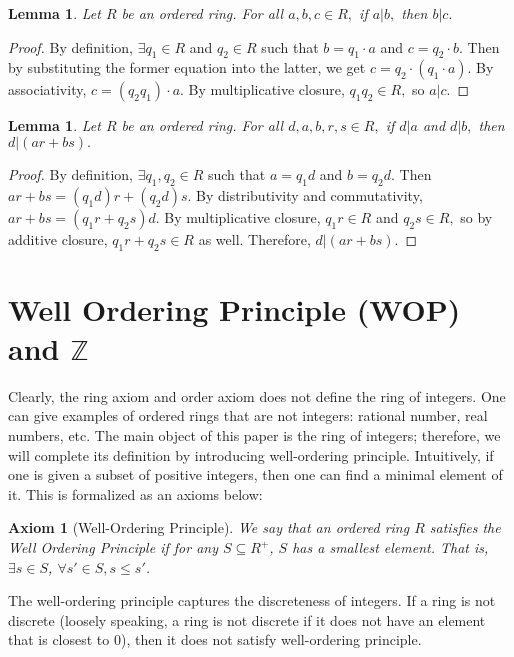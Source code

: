 \documentclass{article}
\newcommand{\Z}{\mathbb{Z}}
\newtheorem{lem}[thm]{Lemma}
\newtheorem{axiom}[thm]{Axiom}
\begin{document}
\begin{lem}
\label{1.9} Let $R$ be an ordered ring. For all $a,b,c\in R,$ if $a|b,$ then $b|c.$
\end{lem}
\begin{proof}
By definition, $\exists q_{1}\in R$ and $q_{2}\in R$ such that $b=q_{1}\cdot a$ and $c=q_{2}\cdot b.$ Then by substituting the former equation into the latter, we get $c=q_{2}\cdot (q_{1}\cdot a).$ By associativity, $c=(q_{2}q_{1})\cdot a.$ By multiplicative closure, $q_{1}q_{2}\in R,$ so $a|c.$
\end{proof}

\begin{lem}
\label{2.10} Let $R$ be an ordered ring. For all $d,a,b,r,s\in R,$ if $d|a$ and $d|b,$ then $d|(ar + bs).$
\end{lem}
\begin{proof}
By definition, $\exists q_{1}, q_{2}\in R$ such that $a=q_{1}d$ and $b=q_{2}d.$ Then $ar+bs = (q_{1}d)r + (q_{2}d)s.$ By distributivity and commutativity, $ar+bs = (q_{1}r + q_{2}s)d.$ By multiplicative closure, $q_{1}r\in R$ and $q_{2}s\in R,$ so by additive closure, $q_{1}r + q_{2}s\in R$ as well. Therefore, $d|(ar+bs).$
\end{proof}






\section{Well Ordering Principle (WOP) and $\Z$}
Clearly, the ring axiom and order axiom does not define the ring of integers. One can give examples of ordered rings that are not integers: rational number, real numbers, etc. The main object of this paper is the ring of integers; therefore, we will complete its definition by introducing well-ordering principle. Intuitively, if one is given a subset of positive integers, then one can find a minimal element of it. This is formalized as an axioms below:

\begin{axiom}[Well-Ordering Principle]
\label{wop}
We say that an ordered ring $R$ satisfies the Well Ordering Principle if 
for any $S\subseteq R^{+}$, $S$ has a smallest element. That is, $\exists s\in S$, $\forall s'\in S, s\leq s'$.
\end{axiom}

The well-ordering principle captures the discreteness of integers. If a ring is not discrete (loosely speaking, a ring is not discrete if it does not have an element that is closest to $0$), then it does not satisfy well-ordering principle.
\end{document}
